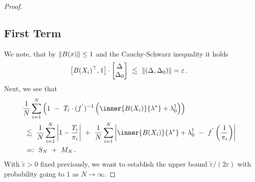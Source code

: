 \begin{proof}
\subsection*{First Term}
We note, that by $\left\lVert B(x)\right\rVert\le 1$ and the Cauchy-Schwarz inequality
it holds
\begin{gather}
  \label{c:first:0}
      \left[ 
       B(X_i)^\top,
       1
     \right]
     \cdot
     \begin{bmatrix}
       \Delta\\
       \Delta_0
     \end{bmatrix}
     \ 
     \lesssim
     \ 
     \norm{(\Delta,\Delta_0)}
     =\varepsilon
     \,.
\end{gather}
Next, we see that
\begin{align}
  \label{c:first:1}
  \begin{split}
  &
     \frac{1}{N}
     \sum_{i=1}^{N} 
     \left( 
       1
       \ 
       -
       \ 
     T_i
     \cdot
     (f^{'})^{-1}
     \left( 
       \inner
       {B(X_i)}
       {\lambda^*}
       +
      \lambda^\dagger_0
     \right)
     \right)
     \\
     &
     \ 
     \lesssim
     \ 
     \frac{1}{N}
     \sum_{i=1}^{N} 
     \left|
     1
     -
     \frac{T_i}{\pi_i}
     \right|
      \ 
     +
      \ 
     \frac{1}{N}
     \sum_{i=1}^{N} 
     \left| 
        \inner
       {B(X_i)}
       {\lambda^*}
       +
      \lambda^\dagger_0
      \ 
        -
        \ 
        f^{'}
        \left( 
          \frac{1}{\pi_i}
        \right)
     \right|
     \\
     &
     \ 
     =:
     \ 
     S_N
     \
     +
     \ 
     M_N
     \,.
\end{split}
\end{align}
With $
\tilde{\varepsilon}
>0
$
fixed previously,
we want to
establish the upper bound
$
\tilde{\varepsilon}
/
(2\varepsilon)
$
with probability going to $1$ as $N\to\infty$.


\end{proof}
